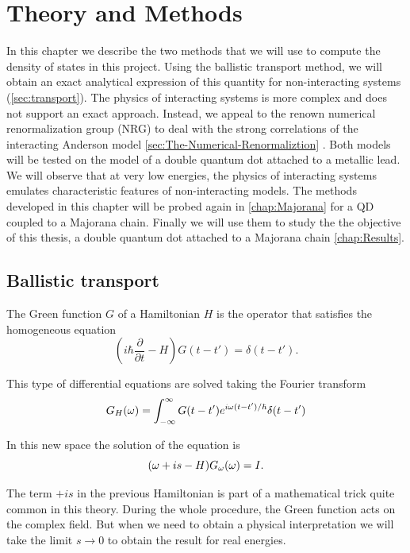 \chapter{Theory and Methods \label{chap: Methods}}

In this chapter we describe the two methods that we will use to compute the density of states in this project. Using the ballistic transport method, we will obtain an exact analytical expression of this quantity for non-interacting systems (\ref{sec:transport}). The physics of interacting systems is more complex and does not support an exact approach. Instead, we appeal to the renown numerical renormalization group (NRG) to deal with the strong correlations of the interacting Anderson model \ref{sec:The-Numerical-Renormaliztion} . Both models will be tested on the model of a double quantum dot attached to a metallic lead. We will observe that at very low energies, the physics of interacting systems emulates characteristic features of non-interacting models. The methods developed in this chapter will be probed again in \ref{chap:Majorana} for a QD coupled to a Majorana chain. Finally we will use them to study the the objective of this thesis, a double quantum dot attached to a Majorana chain \ref{chap:Results}.  


\section{Ballistic transport \label{sec:transport} }

The Green function $G$ of a Hamiltonian $H$ is the operator that satisfies the homogeneous equation 
\begin{equation}
    \left(i\hbar\frac{\partial}{\partial t}-H\right)G\left(t-t'\right)=\delta(t-t').
\end{equation}

This type of differential equations are solved taking the Fourier transform 
\begin{equation}
    G_{H}(\omega)=\int_{-\infty}^{\infty}G(t-t')e^{i\omega(t-t')/\hbar}\delta(t-t')
\end{equation}

In this new space the solution of the equation is 
$$(\omega+is -H)G_{\omega}(\omega)=I.$$ 

The term $+is$ in the previous Hamiltonian is part of a mathematical trick quite common in this theory. During the whole procedure, the Green function acts on the complex field. But when we need to obtain a physical interpretation we will take the limit $s\rightarrow0$ to obtain the result for real energies. 

